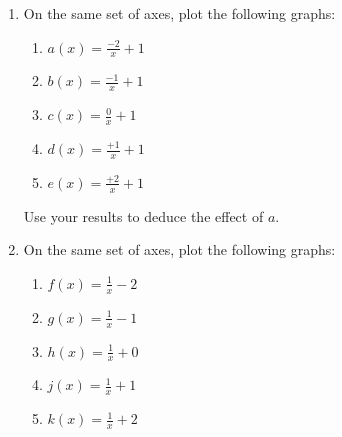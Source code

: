     \addtocounter{footnote}{-0}
    
\label{m39341*secfhsst!!!underscore!!!id2774}
            \nopagebreak
            
        
        \label{m39341*id246236}\begin{enumerate}[noitemsep, label=\textbf{\arabic*}. ] 
            \label{m39341*uid139}\item On the same set of axes, plot the following graphs:
\label{m39341*id246252}\begin{enumerate}[noitemsep, label=\textbf{\alph*}. ] 
            \label{m39341*uid140}\item \begin{math}a\left(x\right)=\frac{-2}{x}+1\end{math}\label{m39341*uid141}\item \begin{math}b\left(x\right)=\frac{-1}{x}+1\end{math}\label{m39341*uid142}\item \begin{math}c\left(x\right)=\frac{0}{x}+1\end{math}\label{m39341*uid143}\item \begin{math}d\left(x\right)=\frac{+1}{x}+1\end{math}\label{m39341*uid144}\item \begin{math}e\left(x\right)=\frac{+2}{x}+1\end{math}\end{enumerate}
        
Use your results to deduce the effect of \begin{math}a\end{math}.
\label{m39341*uid145}\item On the same set of axes, plot the following graphs:
\label{m39341*id246494}\begin{enumerate}[noitemsep, label=\textbf{\alph*}. ] 
            \label{m39341*uid146}\item \begin{math}f\left(x\right)=\frac{1}{x}-2\end{math}\label{m39341*uid147}\item \begin{math}g\left(x\right)=\frac{1}{x}-1\end{math}\label{m39341*uid148}\item \begin{math}h\left(x\right)=\frac{1}{x}+0\end{math}\label{m39341*uid149}\item \begin{math}j\left(x\right)=\frac{1}{x}+1\end{math}\label{m39341*uid150}\item \begin{math}k\left(x\right)=\frac{1}{x}+2\end{math}\end{enumerate}
        

\end{enumerate}
